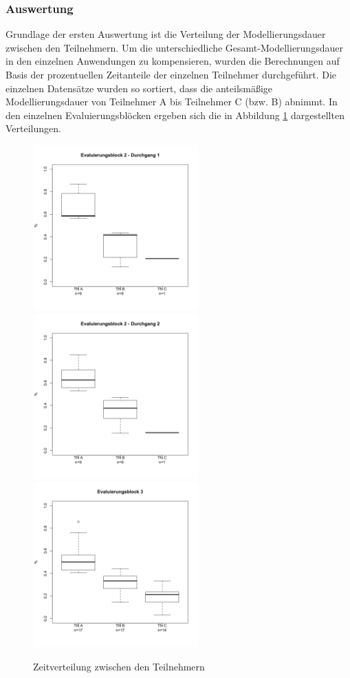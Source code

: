 \subsubsection{Auswertung} %

Grundlage der ersten Auswertung ist die Verteilung der Modellierungsdauer zwischen den Teilnehmern. Um die unterschiedliche Gesamt-Modellierungsdauer in den einzelnen Anwendungen zu kompensieren, wurden die Berechnungen auf Basis der prozentuellen Zeitanteile der einzelnen Teilnehmer durchgeführt. Die einzelnen Datensätze wurden so sortiert, dass die anteilsmäßige Modellierungsdauer von Teilnehmer A bis Teilnehmer C (bzw. B) abnimmt. In den einzelnen Evaluierungsblöcken ergeben sich die in Abbildung \ref{fig:img_Evaluierung_timeDist} dargestellten Verteilungen.

\begin{figure}[htbp]
	\centering
		\includegraphics[height=2.5in]{img/Evaluierung/timeDistSE1.png}
		\includegraphics[height=2.5in]{img/Evaluierung/timeDistSE2.png}
		\includegraphics[height=2.5in]{img/Evaluierung/timeDistUE.png}
	\caption{Zeitverteilung zwischen den Teilnehmern}
	\label{fig:img_Evaluierung_timeDist}
\end{figure}

